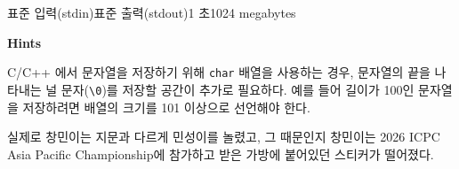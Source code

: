 \begin{problem}{\probtitle}{표준 입력(stdin)}{표준 출력(stdout)}{1 초}{1024 megabytes}
\Example


\begin{examplethree}
\end{examplethree}

{\beforeproblemsectioncaption\noindent\bf\problemsectionfont
\textsf{Hints}}\nopagebreak\par\afterproblemsectioncaption

C/C++ 에서 문자열을 저장하기 위해 \texttt{char} 배열을 사용하는 경우, 문자열의 끝을 나타내는 널 문자(\texttt{\textbackslash 0})를 저장할 공간이 추가로 필요하다. 예를 들어 길이가 100인 문자열을 저장하려면 배열의 크기를 101 이상으로 선언해야 한다.

\Notes

실제로 창민이는 지문과 다르게 민성이를 놀렸고, 그 때문인지 창민이는 2026 ICPC Asia Pacific Championship에 참가하고 받은 가방에 붙어있던 스티커가 떨어졌다. 



\end{problem}